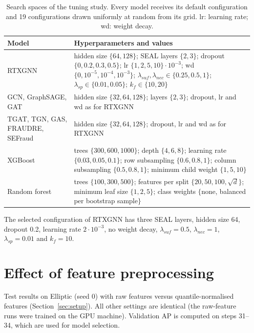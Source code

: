 \begin{table}[!ht]
\centering
\caption{Search spaces of the tuning study. Every model receives its default configuration and 19 configurations drawn uniformly at random from its grid. lr: learning rate; wd: weight decay.}
\label{tab:search_spaces}
\footnotesize
\begin{tabular}{p{}p{}}
\toprule
Model & Hyperparameters and values\\
\midrule
RTXGNN & hidden size $\{64,128\}$; SEAL layers $\{2,3\}$; dropout $\{0,0.2,0.3,0.5\}$; lr $\{1,2,5,10\}\cdot10^{-3}$; wd $\{0,10^{-5},10^{-4},10^{-3}\}$; $\lambda_{suf},\lambda_{nec}\in\{0.25,0.5,1\}$; $\lambda_{sp}\in\{0.01,0.05\}$; $k_f\in\{10,20\}$\\
GCN, GraphSAGE, GAT & hidden size $\{32,64,128\}$; layers $\{2,3\}$; dropout, lr and wd as for RTXGNN\\
TGAT, TGN, GAS, FRAUDRE, SEFraud & hidden size $\{32,64,128\}$; dropout, lr and wd as for RTXGNN\\
XGBoost & trees $\{300,600,1000\}$; depth $\{4,6,8\}$; learning rate $\{0.03,0.05,0.1\}$; row subsampling $\{0.6,0.8,1\}$; column subsampling $\{0.5,0.8,1\}$; minimum child weight $\{1,5,10\}$\\
Random forest & trees $\{100,300,500\}$; features per split $\{20,50,100,\sqrt{d}\}$; minimum leaf size $\{1,2,5\}$; class weights $\{$none, balanced per bootstrap sample$\}$\\
\bottomrule
\end{tabular}
\end{table}

The selected configuration of RTXGNN has three SEAL layers, hidden size 64, dropout 0.2, learning rate $2\cdot10^{-3}$, no weight decay, $\lambda_{suf}=0.5$, $\lambda_{nec}=1$, $\lambda_{sp}=0.01$ and $k_f=10$.

\section{Effect of feature preprocessing}
\label{app:preprocessing}

\begin{table}[!ht]
\centering
\caption{Test results on Elliptic (seed 0) with raw features versus quantile-normalised features (Section~\ref{sec:setup}). All other settings are identical (the raw-feature runs were trained on the GPU machine). Validation AP is computed on steps 31--34, which are used for model selection.}
\label{tab:preprocessing}
\footnotesize
\begin{adjustbox}{max width=\textwidth}\end{adjustbox}
\end{table}
